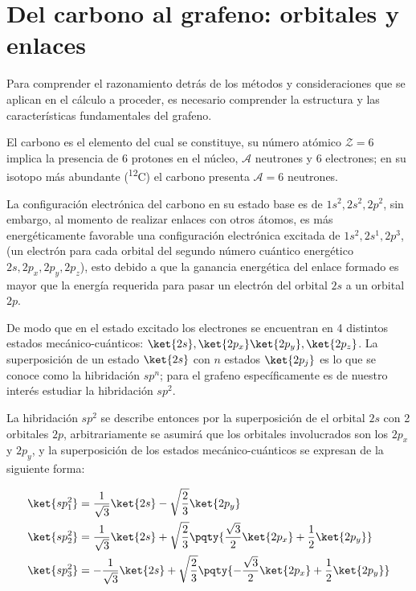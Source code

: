 \section{Del carbono al grafeno: orbitales y enlaces}

Para comprender el razonamiento detrás de los métodos y consideraciones que se 
aplican en el cálculo a proceder, es necesario comprender la estructura y las 
características fundamentales del grafeno.

El carbono es el elemento del cual se constituye, su número atómico $ \mathcal{Z} = 
6 $ implica la presencia de 6 protones en el núcleo, $ \mathcal A $ neutrones y 6 
electrones; en su isotopo más abundante (\textsuperscript{12}C) el carbono presenta 
$ \mathcal{A} = 6 $ neutrones.

La configuración electrónica del carbono en su estado base es de $ 1s^{2}, 2s^{2}, 
2p^{2} $,  sin embargo, al momento de realizar enlaces con otros átomos, es más 
energéticamente favorable una configuración electrónica excitada de $ 1s^{2}, 
2s^{1}, 2p^{3} $, (un electrón para cada orbital del segundo número cuántico 
energético $ 2s, 2p_x, 2p_y, 2p_z $), esto debido a que la ganancia energética del 
enlace formado es mayor que la energía requerida para pasar un electrón del orbital 
$ 2s $ a un orbital $ 2p $. 

De modo que en el estado excitado los electrones se encuentran en 4 distintos 
estados mecánico-cuánticos: $ \ket{2s}, \ket{2p_x}\ket{2p_y}, \ket{2p_z} $. La 
superposición de un estado $ \ket{2s} $ con $ n $ estados $ \ket{2p_j} $ es lo que 
se conoce como la hibridación $ sp^n $; para el grafeno específicamente es de 
nuestro interés estudiar la hibridación $ sp^2 $.

La hibridación $ sp^2 $ se describe entonces por la superposición de el orbital $ 2s 
$ con 2 orbitales $ 2p $, arbitrariamente se asumirá que los orbitales involucrados 
son los $ 2p_x $ y $ 2p_y $, y la superposición de los estados mecánico-cuánticos se 
expresan de la siguiente forma:

\begin{subequations}
	\begin{align}
	\ket{sp_1^2} &= \frac{1}{\sqrt3}\ket{2s} - \sqrt{\frac{2}{3}}\ket{2p_y} \\
	\ket{sp_2^2} &= \frac{1}{\sqrt3}\ket{2s} + 
	\sqrt{\frac{2}{3}}\pqty{\frac{\sqrt3}{2}\ket{2p_x} + \frac{1}{2}\ket{2p_y}}\\
	\ket{sp_3^2} &= -\frac{1}{\sqrt3}\ket{2s} + 
	\sqrt{\frac{2}{3}}\pqty{-\frac{\sqrt3}{2}\ket{2p_x} + \frac{1}{2}\ket{2p_y}}
	\end{align}
\end{subequations}


